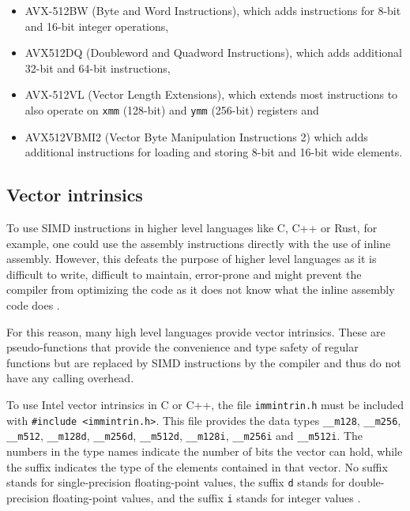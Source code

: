 \documentclass[12pt, a4paper, openright, twoside]{tiarbeit}
\begin{document}
\begin{itemize}
  \item AVX-512BW (Byte and Word Instructions), which adds instructions for
        8-bit and 16-bit integer operations,

  \item AVX512DQ (Doubleword and Quadword Instructions), which adds additional
        32-bit and 64-bit instructions,

  \item AVX-512VL (Vector Length Extensions), which extends most instructions
        to also operate on \texttt{xmm} (128-bit) and \texttt{ymm} (256-bit) registers
        and

  \item AVX512VBMI2 (Vector Byte Manipulation Instructions 2) which adds
        additional instructions for loading and storing 8-bit and 16-bit wide elements.
\end{itemize}

\subsection{Vector intrinsics}

To use SIMD instructions in higher level languages like C, C++ or Rust, for example,
one could use the assembly instructions directly with the use of inline assembly.
However, this defeats the purpose of higher level languages as it is difficult
to write, difficult to maintain, error-prone and
might prevent the compiler from optimizing the code as it does not know
what the inline assembly code does \citep{gcc-wiki-dont-use-inline-assembly}.

For this reason, many high level languages
provide vector intrinsics. These are pseudo-functions that provide the
convenience and type safety of regular functions but are replaced by SIMD
instructions by the compiler and thus do not have any calling overhead.

To use Intel vector intrinsics in C or C++, the file \verb!immintrin.h! must
be included with \texttt{\#include <immintrin.h>}.
This file provides the data types \texttt{\_\_m128}, \texttt{\_\_m256}, \texttt{\_\_m512},
\texttt{\_\_m128d}, \texttt{\_\_m256d}, \texttt{\_\_m512d},
\texttt{\_\_m128i}, \texttt{\_\_m256i} and \texttt{\_\_m512i}.
The numbers in the type names indicate the number of bits the vector can hold,
while the suffix indicates the type of the elements contained in that vector.
No suffix stands for single-precision floating-point values, the suffix
\texttt{d} stands for double-precision floating-point values, and the suffix
\texttt{i} stands for integer values
\citep[pp. 3-12 - 3-14]{intel-manual}.
\end{document}
